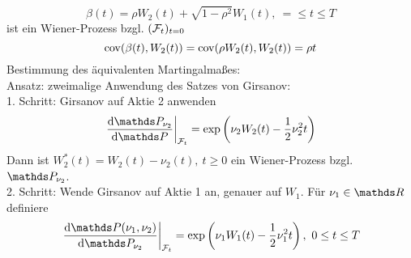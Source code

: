 \[
\beta(t)=\rho W_2(t)+\sqrt{1-\rho^2}W_1(t),~=\le t\le T
\]
ist ein Wiener-Prozess bzgl. $(\mathcal{F}_t)_{t=0}$
\[
\operatorname{cov}(\beta(t),W_2(t))=\operatorname{cov}(\rho W_2(t),W_2(t))=\rho t
\]
Bestimmung des äquivalenten Martingalmaßes:\\
Ansatz:
zweimalige Anwendung des Satzes von Girsanov:\\
1. Schritt:
Girsanov auf Aktie 2 anwenden
\[
\left.\difff{\Pw_{\nu_2}}{\Pw}\right|_{\F_t}=\exp\enbrace{\nu_2 W_2(t)-\frac{1}{2}\nu_2^2t}
\]
Dann ist $W_2^*(t)=W_2(t)-\nu_2(t),~t\ge0$ ein Wiener-Prozess bzgl. $\Pw_{\nu_2}$.\\
2. Schritt:
Wende Girsanov auf Aktie 1 an, genauer auf $W_1$.
Für $\nu_1\in \R$ definiere
\[
\left.\difff{\Pw{(\nu_1,\nu_2)}}{\Pw_{\nu_2}}\right|_{\F_t}=\exp\enbrace{\nu_1 W_1(t)-\frac{1}{2}\nu_1^2t},~0\le t\le T
\]






\cleardoubleoddemptypage
{}
\setcounter{page}{1}


\printindex
\listoffigures
